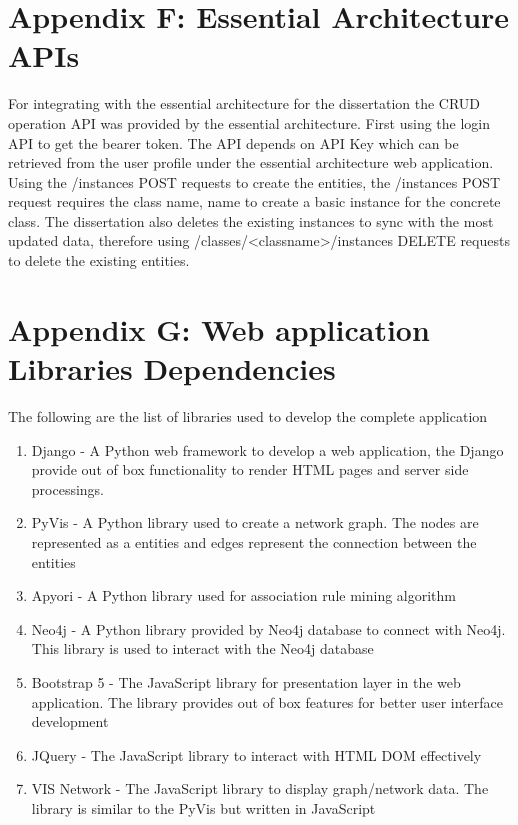 \documentclass{article}
\begin{document}
\section{Appendix F: Essential Architecture APIs}
For integrating with the essential architecture for the dissertation the CRUD operation API was provided by the essential architecture. First using the login API to get the bearer token. The API depends on API Key which can be retrieved from the user profile under the essential architecture web application. Using the /instances POST requests to create the entities, the /instances POST request requires the class name, name to create a basic instance for the concrete class. The dissertation also deletes the existing instances to sync with the most updated data, therefore using /classes/<classname>/instances DELETE requests to delete the existing entities.

\section{Appendix G: Web application Libraries Dependencies}

The following are the list of libraries used to develop the complete application

\begin{enumerate}
    \item Django - A Python web framework to develop a web application, the Django provide out of box functionality to render HTML pages and server side processings.
    \item PyVis - A Python library used to create a network graph. The nodes are represented as a entities and edges represent the connection between the entities
    \item Apyori - A Python library used for association rule mining algorithm
    \item Neo4j - A Python library provided by Neo4j database to connect with Neo4j. This library is used to interact with the Neo4j database
    \item Bootstrap 5 - The JavaScript library for presentation layer in the web application. The library provides out of box features for better user interface development
    \item JQuery - The JavaScript library to interact with HTML DOM effectively
    \item VIS Network - The JavaScript library to display graph/network data. The library is similar to the PyVis but written in JavaScript
\end{enumerate}
\end{document}
